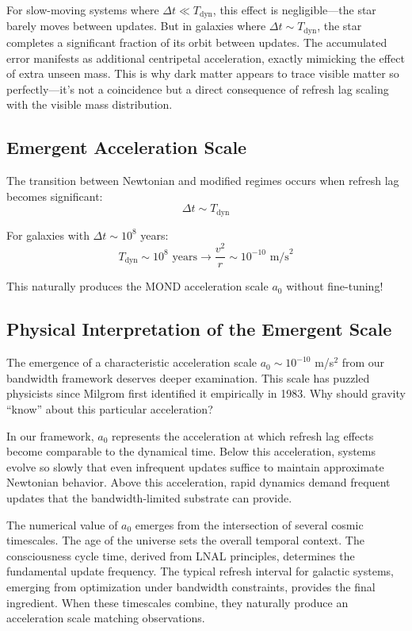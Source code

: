 \documentclass[twocolumn,prd,amsmath,amssymb,aps,superscriptaddress,nofootinbib]{revtex4-2}
\begin{document}
For slow-moving systems where $\Delta t \ll T_{\text{dyn}}$, this effect is negligible---the star barely moves between updates. But in galaxies where $\Delta t \sim T_{\text{dyn}}$, the star completes a significant fraction of its orbit between updates. The accumulated error manifests as additional centripetal acceleration, exactly mimicking the effect of extra unseen mass. This is why dark matter appears to trace visible matter so perfectly---it's not a coincidence but a direct consequence of refresh lag scaling with the visible mass distribution.

\subsection{Emergent Acceleration Scale}

The transition between Newtonian and modified regimes occurs when refresh lag becomes significant:
\begin{equation}
\Delta t \sim T_{\text{dyn}}
\end{equation}

For galaxies with $\Delta t \sim 10^8$ years:
\begin{equation}
T_{\text{dyn}} \sim 10^8 \text{ years} \rightarrow \frac{v^2}{r} \sim 10^{-10} \text{ m/s}^2
\end{equation}

This naturally produces the MOND acceleration scale $a_0$ without fine-tuning!

\subsection{Physical Interpretation of the Emergent Scale}

The emergence of a characteristic acceleration scale $a_0 \sim 10^{-10}$ m/s$^2$ from our bandwidth framework deserves deeper examination. This scale has puzzled physicists since Milgrom first identified it empirically in 1983. Why should gravity ``know'' about this particular acceleration?

In our framework, $a_0$ represents the acceleration at which refresh lag effects become comparable to the dynamical time. Below this acceleration, systems evolve so slowly that even infrequent updates suffice to maintain approximate Newtonian behavior. Above this acceleration, rapid dynamics demand frequent updates that the bandwidth-limited substrate can provide.

The numerical value of $a_0$ emerges from the intersection of several cosmic timescales. The age of the universe sets the overall temporal context. The consciousness cycle time, derived from LNAL principles, determines the fundamental update frequency. The typical refresh interval for galactic systems, emerging from optimization under bandwidth constraints, provides the final ingredient. When these timescales combine, they naturally produce an acceleration scale matching observations.
\end{document}
